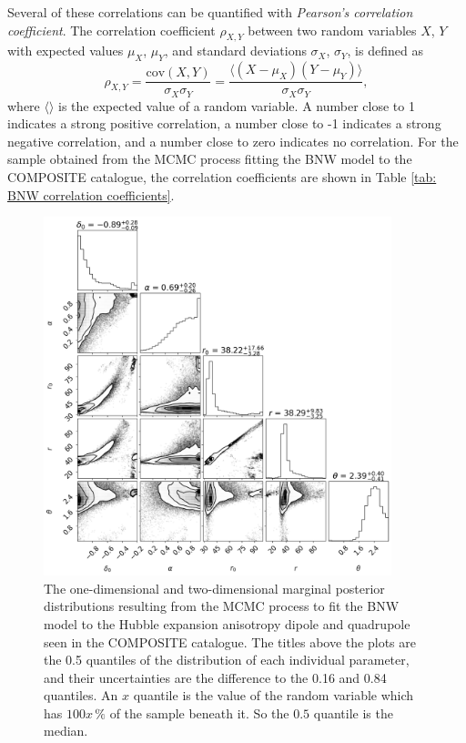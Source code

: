 \documentclass[a4paper,12pt]{report}
\begin{document}
Several of these correlations can be quantified with \textit{Pearson's correlation coefficient}. The correlation coefficient $\rho_{X,Y}$ between two random variables $X$, $Y$ with expected values $\mu_X$, $\mu_Y$, and standard deviations $\sigma_X$, $\sigma_Y$, is defined as
\begin{equation}\label{eqn: pearson correlation coefficient}
    \rho_{X,Y} = \frac{\text{cov}(X,Y)}{\sigma_X \sigma_Y}
    = \frac{\langle (X-\mu_X)(Y-\mu_Y) \rangle}{\sigma_X \sigma_Y},
\end{equation}
where $\langle \rangle$ is the expected value of a random variable. A number close to 1 indicates a strong positive correlation, a number close to -1 indicates a strong negative correlation, and a number close to zero indicates no correlation. For the sample obtained from the MCMC process fitting the BNW model to the COMPOSITE catalogue, the correlation coefficients are shown in Table \ref{tab: BNW correlation coefficients}.

\begin{figure}[!t]
    \centering
    \includegraphics[width=0.9\textwidth]{BNW Model MCMC/composite hubble mcmc dip and quad.png}
    \caption{The one-dimensional and two-dimensional marginal posterior distributions resulting from the MCMC process to fit the BNW model to the Hubble expansion anisotropy dipole and quadrupole seen in the COMPOSITE catalogue. The titles above the plots are the 0.5 quantiles of the distribution of each individual parameter, and their uncertainties are the difference to the 0.16 and 0.84 quantiles. An $x$ quantile is the value of the random variable which has $100x\,\%$ of the sample beneath it. So the $0.5$ quantile is the median.}
    \label{fig: BNW Hubble expansion dip and quad MCMC corner}
\end{figure}
\end{document}
